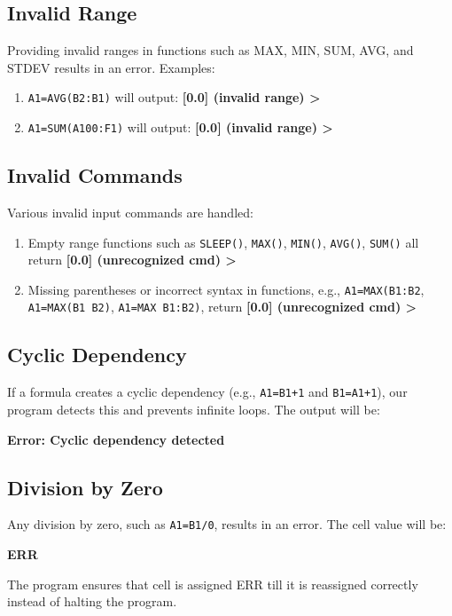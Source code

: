 \documentclass[a4paper]{article}
\begin{document}
\subsection{Invalid Range}
Providing invalid ranges in functions such as MAX, MIN, SUM, AVG, and STDEV results in an error. Examples:
\begin{enumerate}
    \item \texttt{A1=AVG(B2:B1)} will output: \textbf{[0.0] (invalid range) >}
    \item \texttt{A1=SUM(A100:F1)} will output: \textbf{[0.0] (invalid range) >}
\end{enumerate}

\subsection{Invalid Commands}
Various invalid input commands are handled:
\begin{enumerate}
    \item Empty range functions such as \texttt{SLEEP()}, \texttt{MAX()}, \texttt{MIN()}, \texttt{AVG()}, \texttt{SUM()} all return \textbf{[0.0] (unrecognized cmd) >}
    \item Missing parentheses or incorrect syntax in functions, e.g., \texttt{A1=MAX(B1:B2}, \texttt{A1=MAX(B1 B2)}, \texttt{A1=MAX B1:B2)}, return \textbf{[0.0] (unrecognized cmd) >}
\end{enumerate}

\subsection{Cyclic Dependency}
If a formula creates a cyclic dependency (e.g., \texttt{A1=B1+1} and \texttt{B1=A1+1}), our program detects this and prevents infinite loops. The output will be:
\begin{center}
    \textbf{Error: Cyclic dependency detected}
\end{center}

\subsection{Division by Zero}
Any division by zero, such as \texttt{A1=B1/0}, results in an error. The cell value will be:
\begin{center}
    \textbf{ERR}
\end{center}
The program ensures that cell is assigned ERR till it is reassigned correctly instead of halting the program.
\end{document}
